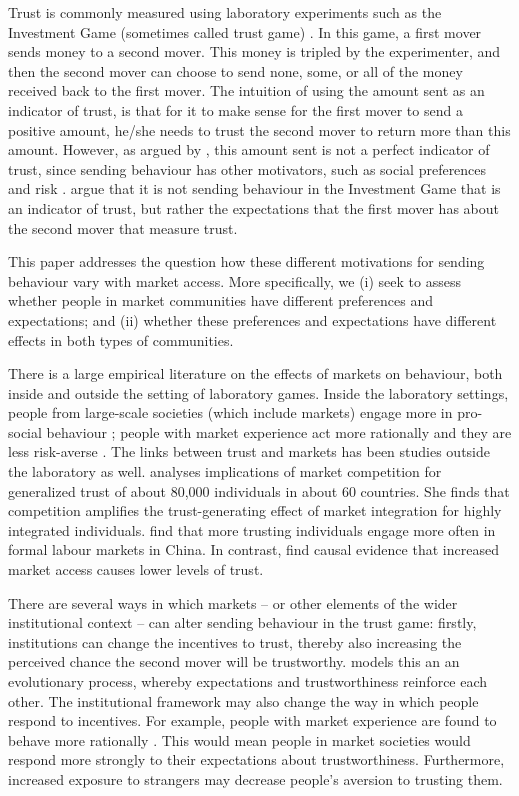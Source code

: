 Trust is commonly measured using laboratory experiments such as the Investment Game (sometimes called trust game) \citep{Berg1995,Glaeser2000b}. In this game, a first mover sends money to a second mover. This money is tripled by the experimenter, and then the second mover can choose to send none, some, or all of the money received back to the first mover. The intuition of using the amount sent as an indicator of trust, is that for it to make sense for the first mover to send a positive amount, he/she needs to trust the second mover to return more than this amount. However, as argued by \cite{Sapienza2013}, this amount sent is not a perfect indicator of trust, since sending behaviour has other motivators, such as social preferences\citep{Ashraf2006,Cox2004} and risk \citep{Karlan2005,Bohnet2004,Bohnet2008}. \cite{Sapienza2013} argue that it is not sending behaviour in the Investment Game that is an indicator of trust, but rather the expectations that the first mover has about the second mover that measure trust.

This paper addresses the question how these different motivations for sending behaviour vary with market access. More specifically, we (i) seek to assess whether people in market communities have different preferences and expectations; and (ii) whether these preferences and expectations have different effects in both types of communities.

There is a large empirical literature on the effects of markets on behaviour, both inside and outside the setting of laboratory games. Inside the laboratory settings, people from large-scale societies (which include markets) engage more in pro-social behaviour \cite{Henrich2005,Henrich2010}; people with market experience act more rationally \citep{List2008,Cecchi2013,Braga2009} and they are less risk-averse \citep{Melesse2015}. The links between trust and markets has been studies outside the laboratory as well. \cite{Fischer2008} analyses implications of market competition for generalized trust of about 80,000 individuals in about 60 countries. She finds that competition amplifies the trust-generating effect of market integration for highly integrated individuals. \cite{Tu2010} find that more trusting individuals engage more often in formal labour markets in China. In contrast,  \cite{Siziba2012} find causal evidence that increased market access causes lower levels of trust.  

There are several ways in which markets -- or other elements of the wider institutional context -- can alter sending behaviour in the trust game: firstly, institutions can change the incentives to trust, thereby also increasing the perceived chance the second mover will be trustworthy. \cite{Tabellini2008} models this an an evolutionary process, whereby expectations and trustworthiness reinforce each other. The institutional framework may also change the way in which people respond to incentives. For example, people with market experience are found to behave more rationally \citep{List2008,Cecchi2013,Braga2009}. This would mean people in market societies would respond more strongly to their expectations about trustworthiness. Furthermore, increased exposure to strangers may decrease people's aversion to trusting them.

